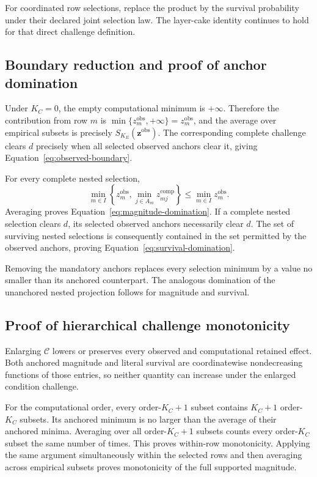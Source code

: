 \documentclass[11pt]{article}
\newcommand{\CSet}{\mathcal{C}}
\theoremstyle{remark}
\begin{document}
For coordinated row selections, replace the product by the survival
probability under their declared joint selection law. The layer-cake identity
continues to hold for that direct challenge definition.

\subsection{Boundary reduction and proof of anchor domination}
\label{app:proof-anchor-domination}

Under $K_C=0$, the empty computational minimum is $+\infty$. Therefore
the contribution from row $m$ is
$\min\{z_m^{\mathrm{obs}},+\infty\}=z_m^{\mathrm{obs}}$, and the average over
empirical subsets is precisely $S_{K_E}(\mathbf z^{\mathrm{obs}})$. The
corresponding complete challenge clears $d$ precisely when all selected
observed anchors clear it, giving Equation~\eqref{eq:observed-boundary}.

For every complete nested selection,
\[
\min_{m\in I}
\left\{z_m^{\mathrm{obs}},
\min_{j\in A_m}z_{mj}^{\mathrm{comp}}\right\}
\leq
\min_{m\in I}z_m^{\mathrm{obs}}.
\]
Averaging proves Equation~\eqref{eq:magnitude-domination}. If a complete
nested selection clears $d$, its selected observed anchors necessarily clear
$d$. The set of surviving nested selections is consequently contained in the
set permitted by the observed anchors, proving
Equation~\eqref{eq:survival-domination}.

Removing the mandatory anchors replaces every selection minimum by a value no
smaller than its anchored counterpart. The analogous domination of the
unanchored nested projection follows for magnitude and survival.

\subsection{Proof of hierarchical challenge monotonicity}
\label{app:proof-monotonicity}

Enlarging $\CSet$ lowers or preserves every observed and computational retained
effect. Both anchored magnitude and literal survival are coordinatewise
nondecreasing functions of those entries, so neither quantity can increase
under the enlarged condition challenge.

For the computational order, every order-$K_C+1$ subset contains
$K_C+1$ order-$K_C$ subsets. Its anchored minimum is no larger than the
average of their anchored minima. Averaging over all order-$K_C+1$ subsets
counts every order-$K_C$ subset the same number of times. This proves
within-row monotonicity. Applying the same argument simultaneously within the
selected rows and then averaging across empirical subsets proves monotonicity
of the full supported magnitude.
\end{document}
